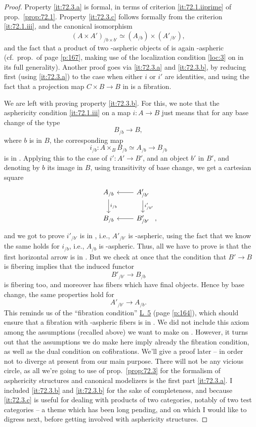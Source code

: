 \begin{proof}
  Property \ref{it:72.3.a} is formal, in terms of criterion
  \ref{it:72.1.iiprime} of prop.\ \ref{prop:72.1}. Property
  \ref{it:72.3.c} follows formally from the criterion
  \ref{it:72.1.iii}, and the canonical isomorphism
  \[ (A\times A')_{/b\times b'} \simeq (A_{/b}) \times (A'_{/b'}),\]
  and the fact that a product of two \scrW-aspheric objects of \Cat{}
  is again \scrW-aspheric (cf.\ prop.\ of page \ref{p:167}, making use
  of the localization condition \ref{loc:3} on \scrW{} in its full
  generality). Another proof goes via \ref{it:72.3.a} and
  \ref{it:72.3.b}, by reducing first (using \ref{it:72.3.a}) to the
  case when either $i$ or $i'$ are identities, and using the fact that
  a projection map $C \times B \to B$ in \Cat{} is a fibration.

  We are left with proving property \ref{it:72.3.b}. For this, we note
  that the asphericity condition \ref{it:72.1.iii} on a map $i:A\to B$
  just means that for any base change of the type
  \[ B_{/b} \to B,\]
  where $b$ is in $B$, the corresponding map
  \[i_{/b}: A\times_B B_{/b} \simeq A_{/b} \to B_{/b}\]
  is in \scrW. Applying this to the case of $i':A'\to B'$, and an
  object $b'$ in $B'$, and denoting by $b$ its image in $B$, using
  transitivity of base change, we get a cartesian square
  \[\begin{tikzcd}[baseline=(O.base)]
    A_{/b} \ar[d,"i_{/b}"] & A'_{/b'}\ar[l]\ar[d,"i'_{/b'}"] \\
    B_{/b} & |[alias=O]| B'_{/b'} \ar[l]
  \end{tikzcd},\]
  and we got to prove $i'_{/b'}$ is in \scrW, i.e., $A'_{/b'}$ is
  \scrW-aspheric, using the fact that we know the same holds for
  $i_{/b}$, i.e., $A_{/b}$ is \scrW-aspheric. Thus, all we have to
  prove is that the first horizontal arrow is in \scrW. But we check
  at once that the condition that $B'\to B$ is fibering implies that
  the induced functor
  \[ B'_{/b'} \to B_{/b}\]
  is fibering too, and moreover has fibers which have final
  objects. Hence by base change, the same properties hold for
  \[ A'_{/b'} \to A_{/b}.\]
  This reminds us of the ``fibration condition''
  \hyperref[it:64.L5]{L~5} (page \ref{p:164}), which should ensure
  that a fibration with \scrW-aspheric fibers is in \scrW. We did not
  include this axiom among the assumptions (recalled above) we want to
  make on \scrW. However, it turns out that the assumptions we do make
  here imply already the fibration condition, as well as the dual
  condition on cofibrations. We'll give a proof later -- in order not
  to diverge at present from our main purpose. There will not be any
  vicious circle, as all we're going to use of prop.\ \ref{prop:72.3}
  for the formalism of asphericity structures and canonical modelizers
  is the first part \ref{it:72.3.a}. I included \ref{it:72.3.b} and
  \ref{it:72.3.b} for the sake of completeness, and because
  \ref{it:72.3.c} is useful for dealing with products of two
  categories, notably of two test categories -- a theme which has been
  long pending, and on which I would like to digress next, before
  getting involved with asphericity structures.
\end{proof}
